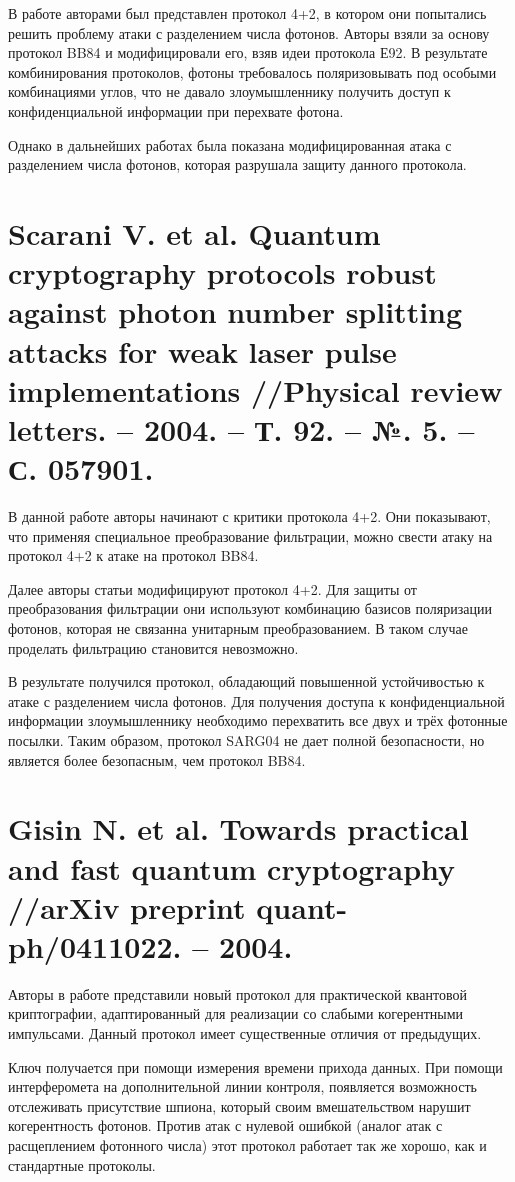 В работе \cite{huttner1995quantum} авторами был представлен протокол 4+2, в котором они попытались решить проблему атаки с разделением числа фотонов. Авторы взяли за основу протокол BB84 и модифицировали его, взяв идеи протокола Е92. В результате комбинирования протоколов, фотоны требовалось поляризовывать под особыми комбинациями углов, что не давало злоумышленнику получить доступ к конфиденциальной информации при перехвате фотона.

Однако в дальнейших работах была показана модифицированная атака с разделением числа фотонов, которая разрушала защиту данного протокола.


\section{Scarani V. et al. Quantum cryptography protocols robust against photon number splitting attacks for weak laser pulse implementations //Physical review letters. – 2004. – Т. 92. – №. 5. – С. 057901.}

В данной работе \cite{scarani2004quantum} авторы начинают с критики протокола 4+2. Они показывают, что применяя специальное преобразование фильтрации, можно свести атаку на протокол 4+2 к атаке на протокол BB84.

Далее авторы статьи модифицируют протокол 4+2. Для защиты от преобразования фильтрации они используют комбинацию базисов поляризации фотонов, которая не связанна унитарным преобразованием. В таком случае проделать фильтрацию становится невозможно.

В результате получился протокол, обладающий повышенной устойчивостью к атаке с разделением числа фотонов. Для получения доступа к конфиденциальной информации злоумышленнику необходимо перехватить все двух и трёх фотонные посылки. Таким образом, протокол SARG04 не дает полной безопасности, но является более безопасным, чем протокол BB84.



\section{Gisin N. et al. Towards practical and fast quantum cryptography //arXiv preprint quant-ph/0411022. – 2004.}
Авторы в работе \cite{gisin2004towards} представили новый протокол для практической квантовой криптографии, адаптированный для реализации со слабыми когерентными импульсами. Данный протокол имеет существенные отличия от предыдущих.

Ключ получается при помощи измерения времени прихода данных. При помощи интерферомета на дополнительной линии контроля, появляется возможность отслеживать присутствие шпиона, который своим вмешательством нарушит когерентность фотонов. Против атак с нулевой ошибкой (аналог атак с расщеплением фотонного числа) этот протокол работает так же хорошо, как и стандартные протоколы.

